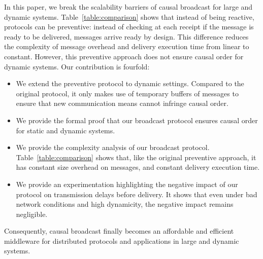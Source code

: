 In this paper, we break the scalability barriers of causal broadcast for large
and dynamic systems. Table~\ref{table:comparison} shows that instead of being
reactive, protocols can be preventive: instead of checking at each receipt if
the message is ready to be delivered, messages arrive ready by design.
This difference reduces the complexity of message overhead and delivery
execution time from linear to constant.
However, this preventive approach does not ensure causal order for dynamic
systems.
Our contribution is fourfold:
\begin{itemize}[leftmargin=*]
\item We extend the preventive protocol to dynamic settings. Compared to the
  original protocol, it only makes use of temporary buffers of messages to
  ensure that new communication means cannot infringe causal order.
\item We provide the formal proof that our broadcast protocol ensures causal
  order for static and dynamic systems.
\item We provide the complexity analysis of our broadcast
  protocol. Table~\ref{table:comparison} shows that, like the original
  preventive approach, it has constant size overhead on messages, and constant
  delivery execution time.
\item We provide an experimentation highlighting the negative impact of our
  protocol on transmission delays before delivery. It shows that even under bad
  network conditions and high dynamicity, the negative impact remains
  negligible.
\end{itemize}
Consequently, causal broadcast finally becomes an affordable and efficient
middleware for distributed protocols and applications in large and dynamic
systems.



